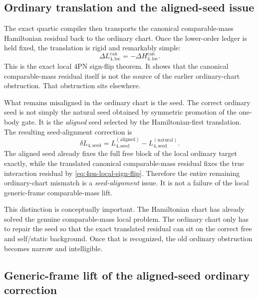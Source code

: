 \documentclass[11pt]{article}
\begin{document}
\subsection{Ordinary translation and the aligned-seed issue}
\label{sec:local-ordinary-translation}

The exact quartic compiler then transports the canonical comparable-mass
Hamiltonian residual back to the ordinary chart.  Once the lower-order ledger is
held fixed, the translation is rigid and remarkably simple:
\begin{equation}
\boxed{
\Delta L_{4,\mathrm{loc}}^{\mathrm{can}}
=
-\Delta H_{4,\mathrm{loc}}^{\mathrm{can}}.
}
\label{eq:4pn-local-sign-flip}
\end{equation}
This is the exact local $4$PN sign-flip theorem.  It shows that the canonical
comparable-mass residual itself is not the source of the earlier ordinary-chart
obstruction.  That obstruction sits elsewhere.

What remains misaligned in the ordinary chart is the seed.  The correct ordinary
seed is not simply the natural seed obtained by symmetric promotion of the
one-body gate.  It is the \emph{aligned} seed selected by the Hamiltonian-first
translation.  The resulting seed-alignment correction is
\begin{equation}
\delta L_{4,\mathrm{seed}}
=
L_{4,\mathrm{seed}}^{(\mathrm{aligned})}
-
L_{4,\mathrm{seed}}^{(\mathrm{natural})}.
\label{eq:4pn-local-seed-alignment-correction}
\end{equation}
The aligned seed already fixes the full free block of the local ordinary target
exactly, while the translated canonical comparable-mass residual fixes the true
interaction residual by \eqref{eq:4pn-local-sign-flip}.  Therefore the entire
remaining ordinary-chart mismatch is a \emph{seed-alignment} issue.  It is not a
failure of the local generic-frame comparable-mass lift.

This distinction is conceptually important.  The Hamiltonian chart has already
solved the genuine comparable-mass local problem.  The ordinary chart only has
to repair the seed so that the exact translated residual can sit on the correct
free and self/static background.  Once that is recognized, the old ordinary
obstruction becomes narrow and intelligible.

\subsection{Generic-frame lift of the aligned-seed ordinary correction}
\label{sec:local-aligned-seed-lift}
\end{document}
